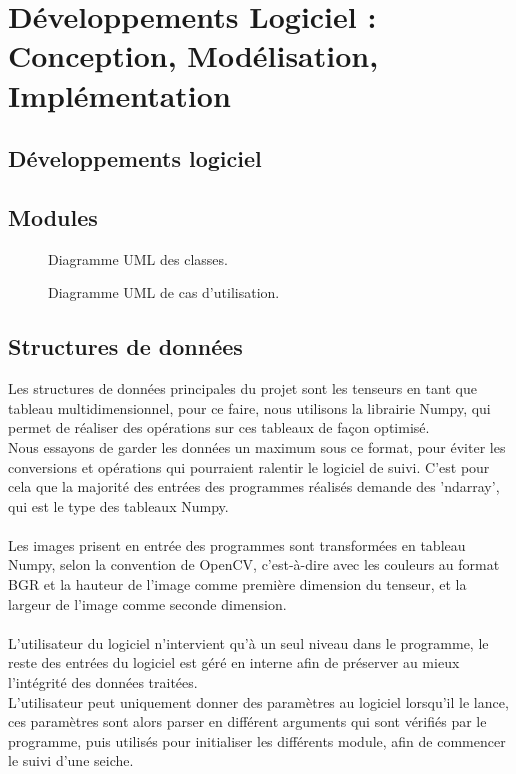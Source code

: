 \chapter{Développements Logiciel : Conception, Modélisation, Implémentation} 

\section{Développements logiciel}

\section{Modules}

\begin{figure}[!htbp]
\center
\caption{Diagramme UML des classes.}
\label{fig:uml_diagram_classes}
\end{figure}
\FloatBarrier

\begin{figure}[!htbp]
\center
\caption{Diagramme UML de cas d'utilisation.}
\label{fig:uml_diagram_usecase}
\end{figure}
\FloatBarrier




\section{Structures de données}
Les structures de données principales du projet sont les tenseurs en tant que tableau multidimensionnel, pour ce faire, nous utilisons la librairie Numpy, qui permet de réaliser des opérations sur ces tableaux de façon optimisé.\\
Nous essayons de garder les données un maximum sous ce format, pour éviter les conversions et opérations qui pourraient ralentir le logiciel de suivi. C'est pour cela que la majorité des entrées des programmes réalisés demande des 'ndarray', qui est le type des tableaux Numpy.\\
\\
Les images prisent en entrée des programmes sont transformées en tableau Numpy, selon la convention de OpenCV, c'est-à-dire avec les couleurs au format BGR et la hauteur de l'image comme première dimension du tenseur, et la largeur de l'image comme seconde dimension.\\
\\
L'utilisateur du logiciel n'intervient qu'à un seul niveau dans le programme, le reste des entrées du logiciel est géré en interne afin de préserver au mieux l'intégrité des données traitées.\\
L'utilisateur peut uniquement donner des paramètres au logiciel lorsqu'il le lance, ces paramètres sont alors parser en différent arguments qui sont vérifiés par le programme, puis utilisés pour initialiser les différents module, afin de commencer le suivi d'une seiche.




